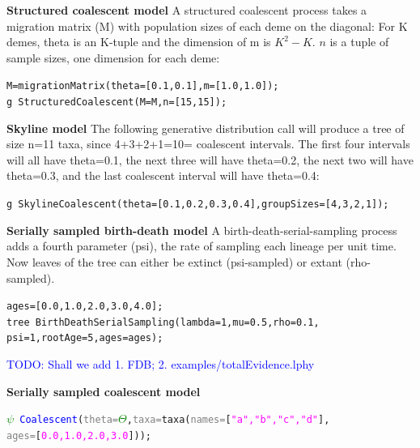 \documentclass[10pt,letterpaper,table]{article}
\begin{document}
{\noindent{} \textbf{Structured coalescent model}
\newline
A structured coalescent process takes a migration matrix (M) with
population sizes of each deme on the diagonal:
For K demes, theta is an K-tuple and the dimension of m is $K^2 -
K$. $n$ is a tuple of sample sizes, one dimension for each deme:

{\small
  \begin{alltt}
  M = migrationMatrix(theta=[0.1, 0.1], m=[1.0, 1.0]);
  g ~ StructuredCoalescent(M=M, n=[15, 15]);
  \end{alltt}
}

\noindent{} \textbf{Skyline model}
\newline
The following generative distribution call will produce a tree of size
n=11 taxa, since 4+3+2+1=10= coalescent intervals.
The first four intervals will all have theta=0.1, the next three will
have theta=0.2, the next two will have theta=0.3, and the last
coalescent interval will have theta=0.4:

{\small
  \begin{alltt}
    g ~ SkylineCoalescent(theta=[0.1, 0.2, 0.3, 0.4], groupSizes=[4,3,2,1]);
  \end{alltt}
}

\noindent{} \textbf{Serially sampled birth-death model}
\newline
A birth-death-serial-sampling \cite{stadler2013dating} process adds a fourth parameter (psi), the rate of sampling each lineage per unit time.
Now leaves of the tree can either be extinct (psi-sampled) or extant (rho-sampled).
{\small
  \begin{alltt}
    ages = [0.0,1.0,2.0,3.0,4.0];
    tree ~ BirthDeathSerialSampling(lambda=1, mu=0.5, rho=0.1, 
                                    psi=1, rootAge=5, ages=ages);
  \end{alltt}
}

\textcolor{blue}{TODO: Shall we add 1. FDB; 2. examples/totalEvidence.lphy}

\noindent{} \textbf{Serially sampled coalescent model}
{\small
  \begin{alltt}
    \textcolor{green}{\(\psi\)} ~ \textcolor{blue}{Coalescent}(\textcolor{gray}{theta=}\textcolor{green}{\(\Theta\)}, \textcolor{gray}{taxa=}\textcolor{magenta!80!black}{taxa}(\textcolor{gray}{names=}[\textcolor{magenta}{"a", "b", "c", "d"}], \\  \textcolor{gray}{ages=}[\textcolor{magenta}{0.0, 1.0, 2.0, 3.0}]));
  \end{alltt}
}


}
\end{document}
